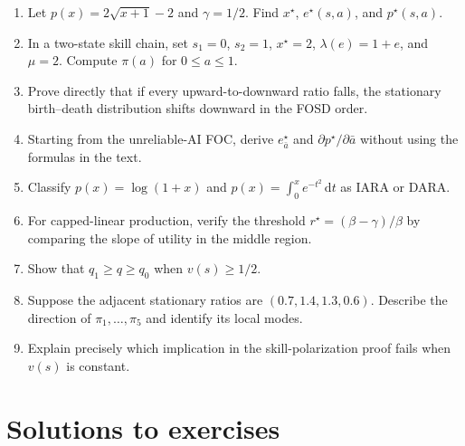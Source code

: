 \documentclass[11pt]{article}
\theoremstyle{tutorial}
\theoremstyle{remark}
\newcommand{\1}{\mathbb{I}}
\newcommand{\dd}{\,\mathrm{d}}
\begin{document}
\begin{enumerate}[label=\textbf{E\arabic*.}]
  \item Let $p(x)=2\sqrt{x+1}-2$ and $\gamma=1/2$.  Find $x^\star$, $e^\star(s,a)$, and
  $p^\star(s,a)$.

  \item In a two-state skill chain, set $s_1=0$, $s_2=1$, $x^\star=2$,
  $\lambda(e)=1+e$, and $\mu=2$.  Compute $\pi(a)$ for $0\le a\le1$.

  \item Prove directly that if every upward-to-downward ratio falls, the stationary birth--death
  distribution shifts downward in the FOSD order.

  \item Starting from the unreliable-AI FOC, derive $e^\star_{\bar a}$ and
  $\partial p^\star/\partial\bar a$ without using the formulas in the text.

  \item Classify $p(x)=\log(1+x)$ and $p(x)=\int_0^x e^{-t^2}\dd t$ as IARA or DARA.

  \item For capped-linear production, verify the threshold $r^\star=(\beta-\gamma)/\beta$ by comparing the
  slope of utility in the middle region.

  \item Show that $q_1\ge q\ge q_0$ when $v(s)\ge1/2$.

  \item Suppose the adjacent stationary ratios are $(0.7,1.4,1.3,0.6)$.  Describe the direction of
  $\pi_1,\ldots,\pi_5$ and identify its local modes.

  \item Explain precisely which implication in the skill-polarization proof fails when $v(s)$ is constant.
\end{enumerate}

\section{Solutions to exercises}
\end{document}
